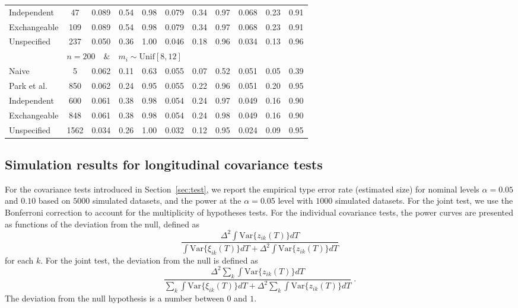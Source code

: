 \documentclass[submit]{smj}
\begin{document}
\begin{table}
\begin{adjustbox}{width=\textwidth}
\begin{tabular}{l|cccccccccc}
		Independent & 47& 0.089 & 0.54 & 0.98 & 0.079 & 0.34 & 0.97 & 0.068 & 0.23 & 0.91 \\  
		Exchangeable &109&  0.089 & 0.54 & 0.98 & 0.079 & 0.34 & 0.97 & 0.068 & 0.23 & 0.91 \\ 
		Unspecified & 237& 0.050 & 0.36 & 1.00 & 0.046 & 0.18 & 0.96 & 0.034 & 0.13 & 0.96 \\
		& \multicolumn{10}{l}{$n=200 \quad\& \quad m_i \sim 
			\text{Unif}[8,12]$}\\
		Naive& 5 & 0.062 & 0.11 & 0.63 & 0.055 & 0.07 & 0.52 & 0.051 & 0.05 & 0.39 \\ 
		Park et al.& 850& 0.062 & 0.24 & 0.95 & 0.055 & 0.22 & 0.96 & 0.051 & 0.20 & 0.95 \\ 
		Independent &600& 0.061 & 0.38 & 0.98 & 0.054 & 0.24 & 0.97 & 0.049 & 0.16 & 0.90 \\ 
		Exchangeable & 848& 0.061 & 0.38 & 0.98 & 0.054 & 0.24 & 0.98 & 0.049 & 0.16 & 0.90 \\ 
		Unspecified & 1562& 0.034 & 0.26 & 1.00 & 0.032 & 0.12 & 0.95 & 0.024 & 0.09 & 0.95 \\ 
		\hline
	\end{tabular}
\end{adjustbox}
\end{table}



\subsection{Simulation results for longitudinal covariance tests}


For the covariance tests introduced in Section~\ref{sec:test}, we report the empirical type \uppercase\expandafter{} error rate (estimated size) for nominal levels $\alpha = 0.05$ and $0.10$ based on $5000$ simulated datasets, and the power at the $\alpha = 0.05$ level with $1000$ simulated datasets. For the joint test, we use the Bonferroni correction to account for the multiplicity of hypotheses tests. For the individual covariance tests, the power curves are presented as functions of the deviation from the null, defined as 
\begin{equation*}
\frac{\Delta^2\int\text{Var}{\{z_{ik}(T)\}}dT}{
	\int \text{Var}{\{\xi_{ik}(T)\}}dT + \Delta^2\int\text{Var}\{z_{ik}(T)\}dT
}
\end{equation*} for each $k$. For the joint test, the deviation from the null is defined as
\begin{equation*}
\frac{\Delta^2\sum_k \int\text{Var}\{z_{ik}(T)\}dT}{
	\sum_k \int \text{Var}\{\xi_{ik}(T)\}dT + \Delta^2 \sum_k \int\text{Var}\{z_{ik}(T)\}dT
}\;.
\end{equation*} 
The deviation from the null hypothesis is a number between $0$ and $1$.
\end{document}
